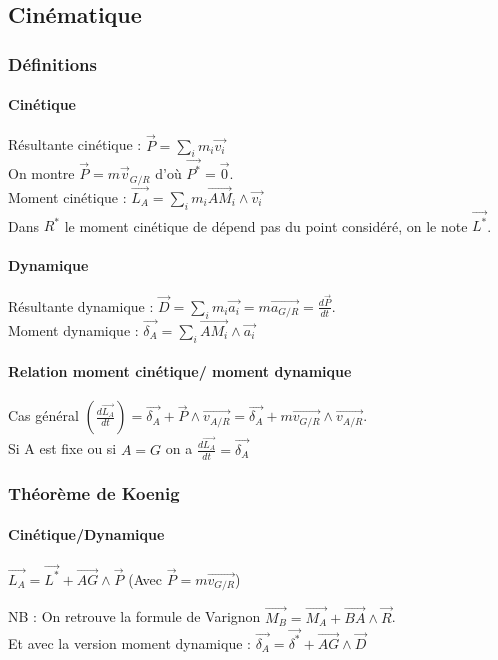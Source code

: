 \documentclass[9pt]{article}
\begin{document}
\begin{multicols*}{2}
\setlength{\columnseprule}{0.1pt}
\part*{Cinématique}
\section{Définitions}
\subsection{Cinétique}
Résultante cinétique : $\overrightarrow{P}=\sum_im_i\overrightarrow{v_i}$
\\On montre $\overrightarrow{P}=m\overrightarrow{v}_{G/R}$ d'où $\overrightarrow{P^*}=\overrightarrow{0}$.\\

Moment cinétique : $\overrightarrow{L_A}=\sum_i{m_i\overrightarrow{AM}_i\wedge\overrightarrow{v_i}}$\\
Dans $R^*$ le moment cinétique de dépend pas du point considéré, on le note $\overrightarrow{L^*}$.
\subsection{Dynamique}

Résultante dynamique : $\overrightarrow{D}=\sum_im_i\overrightarrow{a_i}=m\overrightarrow{a_{G/R}}=\frac{d\overrightarrow{P}}{dt}$.\\
Moment dynamique : $\overrightarrow{\delta_A}=\sum_i\overrightarrow{AM_i}\wedge\overrightarrow{a_i}$

\subsection{Relation moment cinétique/ moment dynamique}
Cas général $\left(\frac{d\overrightarrow{L_A}}{dt}\right) = \overrightarrow{\delta_A} + \overrightarrow{P}\wedge\overrightarrow{v_{A/R}} = \overrightarrow{\delta_A} + m\overrightarrow{v_{G/R}}\wedge\overrightarrow{v_{A/R}}$.\\
Si A est fixe ou si $A=G$ on a $\frac{d\overrightarrow{L_A}}{dt}=\overrightarrow{\delta_A}$
\section{Théorème de Koenig}
\subsection{Cinétique/Dynamique}
\begin{center}
$\boxed{\overrightarrow{L_A}=\overrightarrow{L^*}+\overrightarrow{AG}\wedge\overrightarrow{P}}$
(Avec $\overrightarrow{P}=m\overrightarrow{v_{G/R}}$)
\end{center}
NB : On retrouve la formule de Varignon $\overrightarrow{M_B}=\overrightarrow{M_A}+\overrightarrow{BA} \wedge \overrightarrow{R}$.
\\Et avec la version moment dynamique : $\overrightarrow{\delta_A}=\overrightarrow{\delta^*}+\overrightarrow{AG}\wedge\overrightarrow{D}$


\end{multicols*}
\end{document}
